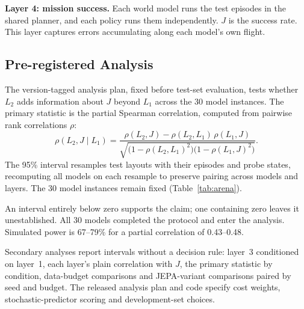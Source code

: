 \documentclass[conference]{IEEEtran}
\begin{document}
\textbf{Layer 4: mission success.} Each world model runs the test episodes in the shared planner, and each policy runs them independently. $J$ is the success rate. This layer captures errors accumulating along each model's own flight.

\subsection{Pre-registered Analysis}\label{sec:prereg}
The version-tagged analysis plan, fixed before test-set evaluation, tests whether $L_2$ adds information about $J$ beyond $L_1$ across the 30 model instances. The primary statistic is the partial Spearman correlation, computed from pairwise rank correlations $\rho$:
\begin{equation}
\rho(L_2, J \mid L_1) = \frac{\rho(L_2, J) - \rho(L_2, L_1)\,\rho(L_1, J)}{\sqrt{\bigl(1 - \rho(L_2, L_1)^2\bigr)\bigl(1 - \rho(L_1, J)^2\bigr)}}.
\label{eq:partial}
\end{equation}
The 95\% interval resamples test layouts with their episodes and probe states, recomputing all models on each resample to preserve pairing across models and layers. The 30 model instances remain fixed (Table~\ref{tab:arena}).

An interval entirely below zero supports the claim; one containing zero leaves it unestablished. All 30 models completed the protocol and enter the analysis. Simulated power is 67--79\% for a partial correlation of 0.43--0.48.

Secondary analyses report intervals without a decision rule: layer~3 conditioned on layer~1, each layer's plain correlation with $J$, the primary statistic by condition, data-budget comparisons and JEPA-variant comparisons paired by seed and budget. The released analysis plan and code specify cost weights, stochastic-predictor scoring and development-set choices.
\end{document}
